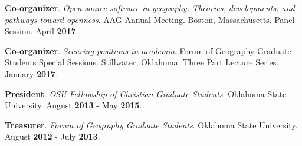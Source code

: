 \begin{cventries}
  \cventry
    {}
    {}
    {}
    {}
    {
       \begin{cvitems}
          \vspace{-3mm}
        \item {\textbf{Co-organizer}. \textit{Open source software in geography:
              Theories, developments, and pathways toward openness}. AAG Annual
            Meeting. Boston, Massachusetts. Panel Session. April \textbf{2017}.}
          \end{cvitems}
          }

  \cventry
    {}
    {}
    {}
    {}
    {
       \begin{cvitems}
          \vspace{-3mm}
        \item {\textbf{Co-organizer}. \textit{Securing positions in academia}.
            Forum of Geography Graduate Students Special Sessions. Stillwater,
            Oklahoma. Three Part Lecture Series. January \textbf{2017}.}
          \end{cvitems}
          }

  \cventry
    {}
    {}
    {}
    {}
    {
       \begin{cvitems}
          \vspace{-3mm}
        \item {\textbf{President}. \textit{OSU Fellowship of Christian Graduate
              Students}. Oklahoma State University. August \textbf{2013} -
            May \textbf{2015}.} 
          \end{cvitems}
          }

  \cventry
    {}
    {}
    {}
    {}
    {
       \begin{cvitems}
          \vspace{-3mm}
        \item {\textbf{Treasurer}. \textit{Forum of Geography Graduate
              Students}. Oklahoma State University. August \textbf{2012} - July
            \textbf{2013}. }
          \end{cvitems}
          }
\end{cventries}